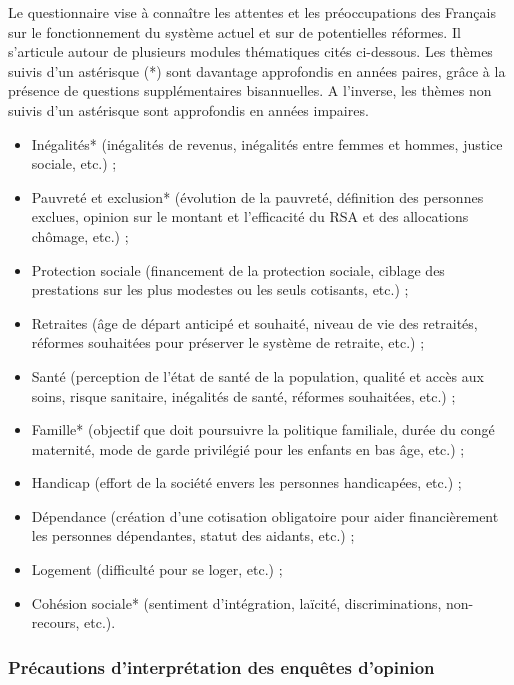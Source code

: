 \documentclass[12pt,a4paper]{reedthesis}
\providecommand{\tightlist}{%
  \setlength{\itemsep}{0pt}\setlength{\parskip}{0pt}}
\begin{document}
Le questionnaire vise à connaître les attentes et les préoccupations des Français sur le fonctionnement du système actuel et sur de potentielles réformes. Il s'articule autour de plusieurs modules thématiques cités ci-dessous. Les thèmes suivis d'un astérisque (*) sont davantage approfondis en années paires, grâce à la présence de questions supplémentaires bisannuelles. A l'inverse, les thèmes non suivis d'un astérisque sont approfondis en années impaires.
\begin{itemize}
\tightlist
\item
  Inégalités* (inégalités de revenus, inégalités entre femmes et hommes, justice sociale, etc.) ;
\item
  Pauvreté et exclusion* (évolution de la pauvreté, définition des personnes exclues, opinion sur le montant et l'efficacité du RSA et des allocations chômage, etc.) ;
\item
  Protection sociale (financement de la protection sociale, ciblage des prestations sur les plus modestes ou les seuls cotisants, etc.) ;
\item
  Retraites (âge de départ anticipé et souhaité, niveau de vie des retraités, réformes souhaitées pour préserver le système de retraite, etc.) ;
\item
  Santé (perception de l'état de santé de la population, qualité et accès aux soins, risque sanitaire, inégalités de santé, réformes souhaitées, etc.) ;
\item
  Famille* (objectif que doit poursuivre la politique familiale, durée du congé maternité, mode de garde privilégié pour les enfants en bas âge, etc.) ;
\item
  Handicap (effort de la société envers les personnes handicapées, etc.) ;
\item
  Dépendance (création d'une cotisation obligatoire pour aider financièrement les personnes dépendantes, statut des aidants, etc.) ;
\item
  Logement (difficulté pour se loger, etc.) ;
\item
  Cohésion sociale* (sentiment d'intégration, laïcité, discriminations, non-recours, etc.).
\end{itemize}
\hypertarget{pruxe9cautions-dinterpruxe9tation-des-enquuxeates-dopinion}{%
\subsubsection{Précautions d'interprétation des enquêtes d'opinion}\label{pruxe9cautions-dinterpruxe9tation-des-enquuxeates-dopinion}}
\end{document}
